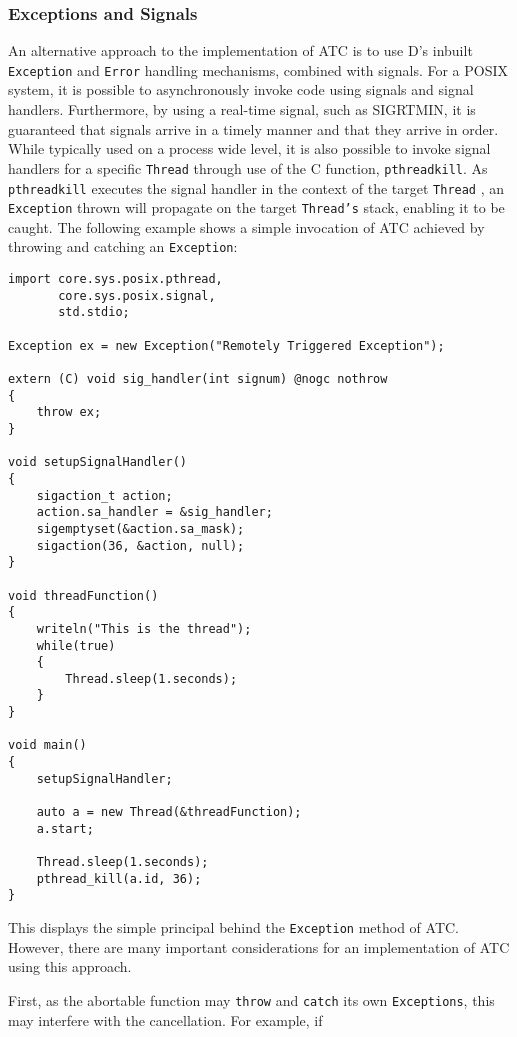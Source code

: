 \subsubsection*{Exceptions and Signals}
An alternative approach to the implementation of ATC is to use D's inbuilt 
\texttt{Exception} and \texttt{Error} handling mechanisms, combined with
signals. 
For a POSIX system, it is possible to asynchronously invoke code using 
signals and signal handlers. Furthermore, by using a
real-time signal, such as SIGRTMIN, it is guaranteed that signals
arrive in a timely manner and that they arrive in order. 
While typically used on a process wide level, it
is also possible to invoke signal handlers for a specific \texttt{Thread} through
use of the C function, \texttt{pthread\textunderscore{}kill}. 
As \texttt{pthread\textunderscore{}kill} executes the signal handler in the
context of the target \texttt{Thread} \cite{pthread-kill}, an \texttt{Exception} thrown will
propagate on the target \texttt{Thread's} stack, enabling it to be caught. 
The following example shows a simple invocation of ATC achieved by throwing and 
catching an \texttt{Exception}:
\begin{lstlisting}[basicstyle=\small]
import core.sys.posix.pthread, 
       core.sys.posix.signal, 
       std.stdio;

Exception ex = new Exception("Remotely Triggered Exception"); 

extern (C) void sig_handler(int signum) @nogc nothrow
{
    throw ex;
}

void setupSignalHandler()
{
    sigaction_t action; 
    action.sa_handler = &sig_handler; 
    sigemptyset(&action.sa_mask);
    sigaction(36, &action, null); 
}

void threadFunction()
{
    writeln("This is the thread"); 
    while(true)
    {
        Thread.sleep(1.seconds);
    }
}

void main()
{
    setupSignalHandler; 

    auto a = new Thread(&threadFunction); 
    a.start; 

    Thread.sleep(1.seconds); 
    pthread_kill(a.id, 36); 
}
\end{lstlisting}
This displays the simple principal behind the \texttt{Exception} method of ATC.
However, there are many important considerations for an implementation of ATC
using this approach. 
\par\bigskip\noindent
First, as the abortable function may \texttt{throw} and \texttt{catch} its own
\texttt{Exceptions}, this may interfere with the cancellation. For example, if
